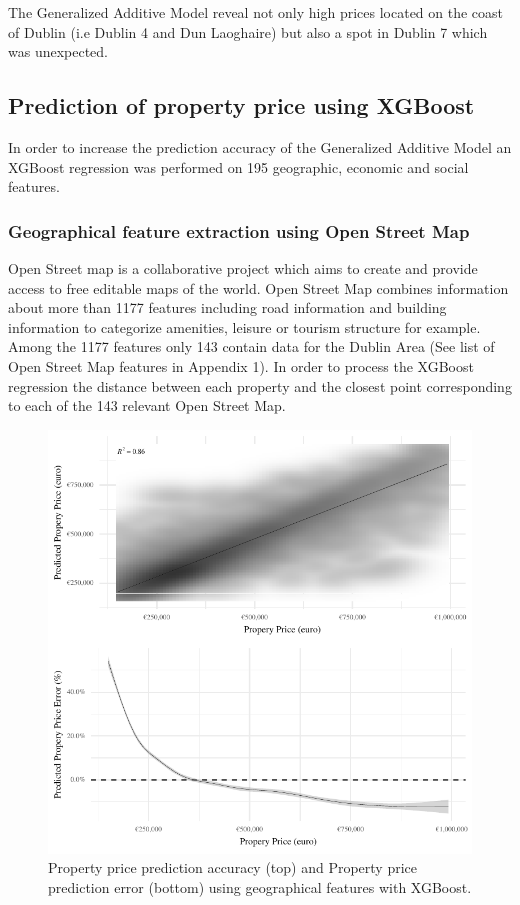 \documentclass[]{elsarticle} %
\begin{document}
The Generalized Additive Model reveal not only high prices located on
the coast of Dublin (i.e Dublin 4 and Dun Laoghaire) but also a spot in
Dublin 7 which was unexpected.

\subsection{Prediction of property price using
XGBoost}\label{prediction-of-property-price-using-xgboost}

In order to increase the prediction accuracy of the Generalized Additive
Model an XGBoost regression was performed on 195 geographic, economic
and social features.

\subsubsection{Geographical feature extraction using Open Street
Map}\label{geographical-feature-extraction-using-open-street-map}

Open Street map is a collaborative project which aims to create and
provide access to free editable maps of the world. Open Street Map
combines information about more than 1177 features including road
information and building information to categorize amenities, leisure or
tourism structure for example. Among the 1177 features only 143 contain
data for the Dublin Area (See list of Open Street Map features in
Appendix 1). In order to process the XGBoost regression the distance
between each property and the closest point corresponding to each of the
143 relevant Open Street Map.

\begin{figure}[H]
\includegraphics{property_price_paper_new_files/figure-latex/OSM-features-xgb-1} \caption{Property price prediction accuracy (top) and Property price prediction error (bottom) using geographical features with XGBoost.}\label{fig:OSM-features-xgb}
\end{figure}
\end{document}
